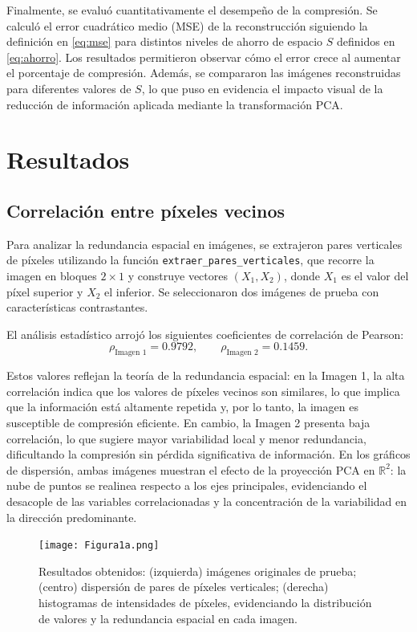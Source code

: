 \documentclass[12pt]{article}
\begin{document}
Finalmente, se evaluó cuantitativamente el desempeño de la compresión. Se calculó el error cuadrático medio (MSE) de la reconstrucción siguiendo la definición en \eqref{eq:mse} para distintos niveles de ahorro de espacio $S$ definidos en \eqref{eq:ahorro}. Los resultados permitieron observar cómo el error crece al aumentar el porcentaje de compresión. Además, se compararon las imágenes reconstruidas para diferentes valores de $S$, lo que puso en evidencia el impacto visual de la reducción de información aplicada mediante la transformación PCA.

\section{Resultados}

\subsection{Correlación entre píxeles vecinos}

Para analizar la redundancia espacial en imágenes, se extrajeron pares verticales de píxeles utilizando la función \texttt{extraer\_pares\_verticales}, que recorre la imagen en bloques $2\times 1$ y construye vectores $(X_1, X_2)$, donde $X_1$ es el valor del píxel superior y $X_2$ el inferior. Se seleccionaron dos imágenes de prueba con características contrastantes.

El análisis estadístico arrojó los siguientes coeficientes de correlación de Pearson:
\[
\rho_{\text{Imagen 1}} = 0.9792,
\qquad
\rho_{\text{Imagen 2}} = 0.1459.
\]

Estos valores reflejan la teoría de la redundancia espacial: en la Imagen 1, la alta correlación indica que los valores de píxeles vecinos son similares, lo que implica que la información está altamente repetida y, por lo tanto, la imagen es susceptible de compresión eficiente. En cambio, la Imagen 2 presenta baja correlación, lo que sugiere mayor variabilidad local y menor redundancia, dificultando la compresión sin pérdida significativa de
información.
En los gráficos de dispersión, ambas imágenes muestran el efecto de la proyección PCA en $\mathbb{R}^2$: la nube de puntos se realinea respecto a los ejes principales, evidenciando el desacople de las variables correlacionadas y la concentración de la variabilidad en la dirección predominante.  

\begin{figure}[H]
    \centering
    \texttt{[image: Figura1a.png]}
    \caption{Resultados obtenidos: (izquierda) imágenes originales de prueba; (centro) dispersión de pares de píxeles verticales; (derecha) histogramas de intensidades de píxeles, evidenciando la distribución de valores y la redundancia espacial en cada imagen.}
    \label{fig:ej1a}
\end{figure}
\end{document}
